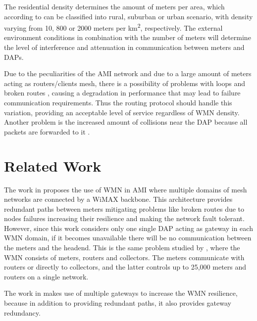 \documentclass[conference]{IEEEtran}
\begin{document}
The residential density determines the amount of meters per area, which according to \cite{Plan2011} can be classified into rural, suburban or urban scenario, with density varying from 10, 800 or 2000 meters per km\textsuperscript{2}, respectively. The external environment conditions in combination with the number of meters will determine the level of interference and attenuation in communication between meters and DAPs.


Due to the peculiarities of the AMI network and due to a large amount of meters acting as routers/clients mesh, there is a possibility of problems with loops and broken routes \cite{ramachandran2007routing}, causing a degradation in performance that may lead to failure communication requirements. Thus the routing protocol should handle this variation, providing an acceptable level of service regardless of WMN density. Another problem is the increased amount of collisions near the DAP because all packets are forwarded to it \cite{Saputro2012}.




\section{Related Work}

The work in \cite{Gungor2006}  proposes the use of WMN in AMI where multiple domains of mesh networks are connected by a WiMAX backbone. This architecture provides redundant paths between meters mitigating problems like broken routes due to nodes failures increasing their resilience and making the network fault tolerant. However, since this work considers only one single DAP acting as gateway in each WMN domain, if it becomes unavailable there will be no communication between the meters and the headend. This is the same problem studied by \cite{5622071}, where the WMN consists of meters, routers and collectors. The meters communicate with routers or directly to collectors, and the latter controls up to 25,000 meters and routers on a single network.

The work in \cite{Silva2010} makes use of multiple gateways to increase the WMN resilience, because in addition to providing redundant paths, it also provides gateway redundancy. 

\end{document}
